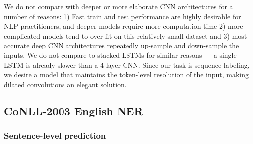 \documentclass[11pt,letterpaper]{article}
\begin{document}
We do not compare with deeper or more elaborate CNN architectures for a number of reasons: 1) Fast train and test performance are highly desirable for NLP practitioners, and deeper models require more computation time 2) more complicated models tend to over-fit on this relatively small dataset and 3) most accurate deep CNN architectures repeatedly up-sample and down-sample the inputs. We do not compare to stacked LSTMs for similar reasons --- a single LSTM is already slower than a 4-layer CNN. Since our task is sequence labeling, we desire a model that maintains the token-level resolution of the input, making dilated convolutions an elegant solution.


\subsection{CoNLL-2003 English NER}
\subsubsection{Sentence-level prediction}
\end{document}
